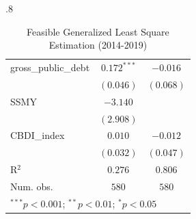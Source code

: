 \begin{table} [H]
\begin{subtable}[c]{.8\textwidth}
{\begin{tabular}{l c c}
gross\_public\_debt & $0.172^{***}$  & $-0.016$     \\
                    & $(0.046)$      & $(0.068)$    \\
SSMY                & $-3.140$       &              \\
                    & $(2.908)$      &              \\
CBDI\_index         & $0.010$        & $-0.012$     \\
                    & $(0.032)$      & $(0.047)$    \\
\hline
R$^2$               & $0.276$        & $0.806$      \\
Num. obs.           & $580$          & $580$        \\
\hline
\multicolumn{3}{l}{\scriptsize{$^{***}p<0.001$; $^{**}p<0.01$; $^{*}p<0.05$}}
\end{tabular}}
\vspace{10mm}  
\end{subtable}

\caption{Feasible Generalized Least Square Estimation (2014-2019)}
\label{FGLS}
\end{table}
